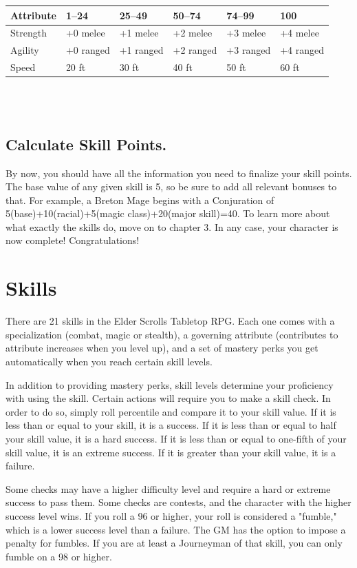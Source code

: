 \documentclass[12pt]{book}
\begin{document}
\begin{tabularx}{\textwidth}{|X|X|X|X|X|X|}
\hline
Attribute & 1--24 & 25--49 & 50--74 & 74--99 & 100\\ \hline
Strength & +0 melee & +1 melee & +2 melee & +3 melee & +4 melee\\ \hline
Agility & +0 ranged & +1 ranged & +2 ranged & +3 ranged & +4 ranged\\ \hline
Speed & 20 ft & 30 ft & 40 ft & 50 ft & 60 ft\\ \hline

\end{tabularx}\\~\\

\section{Calculate Skill Points.}
By now, you should have all the information you need to finalize your skill points. The base value of any given skill is 5, so be sure to add all relevant bonuses to that. For example, a Breton Mage begins with a Conjuration of 5(base)+10(racial)+5(magic class)+20(major skill)=40. To learn more about what exactly the skills do, move on to chapter 3. In any case, your character is now complete! Congratulations!

\chapter{Skills}

There are 21 skills in the Elder Scrolls Tabletop RPG. Each one comes with a specialization (combat, magic or stealth), a governing attribute (contributes to attribute increases when you level up), and a set of mastery perks you get automatically when you reach certain skill levels.

In addition to providing mastery perks, skill levels determine your proficiency with using the skill. Certain actions will require you to make a skill check. In order to do so, simply roll percentile and compare it to your skill value. If it is less than or equal to your skill, it is a success. If it is less than or equal to half your skill value, it is a hard success. If it is less than or equal to one-fifth of your skill value, it is an extreme success. If it is greater than your skill value, it is a failure.

Some checks may have a higher difficulty level and require a hard or extreme success to pass them. Some checks are contests, and the character with the higher success level wins. If you roll a 96 or higher, your roll is considered a "fumble," which is a lower success level than a failure. The GM has the option to impose a penalty for fumbles. If you are at least a Journeyman of that skill, you can only fumble on a 98 or higher.
\end{document}
